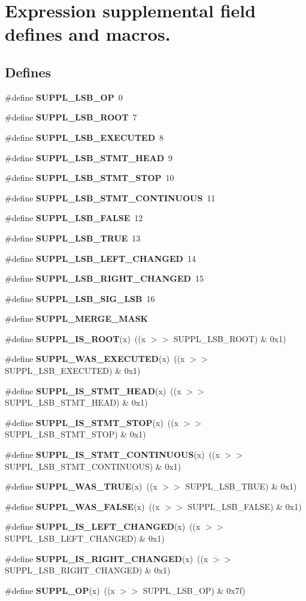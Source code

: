 \section{Expression supplemental field defines and macros.}
\label{group__expr__suppl}
\subsection*{Defines}
\begin{CompactItemize}
\item 
\#define {\bf SUPPL\_\-LSB\_\-OP}\ 0
\item 
\#define {\bf SUPPL\_\-LSB\_\-ROOT}\ 7
\item 
\#define {\bf SUPPL\_\-LSB\_\-EXECUTED}\ 8
\item 
\#define {\bf SUPPL\_\-LSB\_\-STMT\_\-HEAD}\ 9
\item 
\#define {\bf SUPPL\_\-LSB\_\-STMT\_\-STOP}\ 10
\item 
\#define {\bf SUPPL\_\-LSB\_\-STMT\_\-CONTINUOUS}\ 11
\item 
\#define {\bf SUPPL\_\-LSB\_\-FALSE}\ 12
\item 
\#define {\bf SUPPL\_\-LSB\_\-TRUE}\ 13
\item 
\#define {\bf SUPPL\_\-LSB\_\-LEFT\_\-CHANGED}\ 14
\item 
\#define {\bf SUPPL\_\-LSB\_\-RIGHT\_\-CHANGED}\ 15
\item 
\#define {\bf SUPPL\_\-LSB\_\-SIG\_\-LSB}\ 16
\item 
\#define {\bf SUPPL\_\-MERGE\_\-MASK}
\item 
\#define {\bf SUPPL\_\-IS\_\-ROOT}(x)\ ((x $>$$>$ SUPPL\_\-LSB\_\-ROOT) \& 0x1)
\item 
\#define {\bf SUPPL\_\-WAS\_\-EXECUTED}(x)\ ((x $>$$>$ SUPPL\_\-LSB\_\-EXECUTED) \& 0x1)
\item 
\#define {\bf SUPPL\_\-IS\_\-STMT\_\-HEAD}(x)\ ((x $>$$>$ SUPPL\_\-LSB\_\-STMT\_\-HEAD) \& 0x1)
\item 
\#define {\bf SUPPL\_\-IS\_\-STMT\_\-STOP}(x)\ ((x $>$$>$ SUPPL\_\-LSB\_\-STMT\_\-STOP) \& 0x1)
\item 
\#define {\bf SUPPL\_\-IS\_\-STMT\_\-CONTINUOUS}(x)\ ((x $>$$>$ SUPPL\_\-LSB\_\-STMT\_\-CONTINUOUS) \& 0x1)
\item 
\#define {\bf SUPPL\_\-WAS\_\-TRUE}(x)\ ((x $>$$>$ SUPPL\_\-LSB\_\-TRUE) \& 0x1)
\item 
\#define {\bf SUPPL\_\-WAS\_\-FALSE}(x)\ ((x $>$$>$ SUPPL\_\-LSB\_\-FALSE) \& 0x1)
\item 
\#define {\bf SUPPL\_\-IS\_\-LEFT\_\-CHANGED}(x)\ ((x $>$$>$ SUPPL\_\-LSB\_\-LEFT\_\-CHANGED) \& 0x1)
\item 
\#define {\bf SUPPL\_\-IS\_\-RIGHT\_\-CHANGED}(x)\ ((x $>$$>$ SUPPL\_\-LSB\_\-RIGHT\_\-CHANGED) \& 0x1)
\item 
\#define {\bf SUPPL\_\-OP}(x)\ ((x $>$$>$ SUPPL\_\-LSB\_\-OP) \& 0x7f)
\end{CompactItemize}


